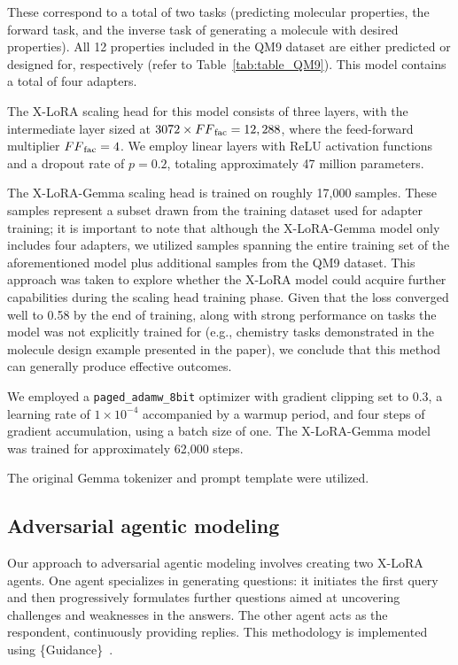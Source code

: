 These correspond to a total of two tasks (predicting molecular properties, the forward task, and the inverse task of generating a molecule with desired properties). All 12 properties included in the QM9 dataset are either predicted or designed for, respectively (refer to Table~\ref{tab:table_QM9}).  
This model contains a total of four adapters.

The X-LoRA scaling head for this model consists of three layers, with the intermediate layer sized at $3072 \times {FF}_{\rm fac} = 12,288$, where the feed-forward multiplier ${FF}_{\rm fac} = 4$. We employ linear layers with ReLU activation functions and a dropout rate of $p=0.2$, totaling approximately 47 million parameters.

The X-LoRA-Gemma scaling head is trained on roughly 17,000 samples. These samples represent a subset drawn from the training dataset used for adapter training; it is important to note that although the X-LoRA-Gemma model only includes four adapters, we utilized samples spanning the entire training set of the aforementioned model plus additional samples from the QM9 dataset. This approach was taken to explore whether the X-LoRA model could acquire further capabilities during the scaling head training phase. Given that the loss converged well to 0.58 by the end of training, along with strong performance on tasks the model was not explicitly trained for (e.g., chemistry tasks demonstrated in the molecule design example presented in the paper), we conclude that this method can generally produce effective outcomes.

We employed a \texttt{paged\_adamw\_8bit} optimizer with gradient clipping set to 0.3, a learning rate of $1\times 10^{-4}$ accompanied by a warmup period, and four steps of gradient accumulation, using a batch size of one. The X-LoRA-Gemma model was trained for approximately 62,000 steps.

The original Gemma tokenizer and prompt template were utilized.

\subsection{Adversarial agentic modeling} Our approach to adversarial agentic modeling involves creating two X-LoRA agents. One agent specializes in generating questions: it initiates the first query and then progressively formulates further questions aimed at uncovering challenges and weaknesses in the answers. The other agent acts as the respondent, continuously providing replies. This methodology is implemented using \{Guidance\}~\cite{Guidance-ai/guidance:Models.}.

